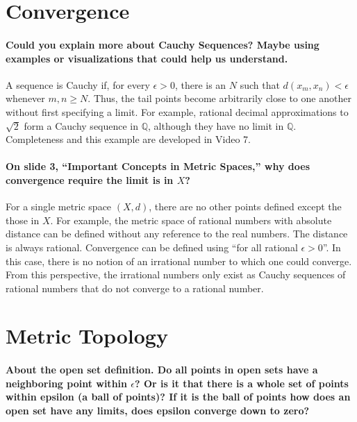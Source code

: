 \documentclass[10pt,english]{article}
\begin{document}
\section{Convergence}

\paragraph{Could you explain more about Cauchy Sequences? Maybe using examples or visualizations that could help us understand.}


A sequence is Cauchy if, for every $\epsilon>0$, there is an $N$ such that $d(x_m,x_n)<\epsilon$ whenever $m,n\geq N$.
Thus, the tail points become arbitrarily close to one another without first specifying a limit.
For example, rational decimal approximations to $\sqrt{2}$ form a Cauchy sequence in $\mathbb{Q}$, although they have no limit in $\mathbb{Q}$.
Completeness and this example are developed in Video 7.


\paragraph{On slide 3, ``Important Concepts in Metric Spaces,'' why does convergence require the limit is in $X$?}

For a single metric space $(X,d)$, there are no other points defined except the those in $X$.
For example, the metric space of rational numbers with absolute distance can be defined without any reference to the real numbers.
The distance is always rational.
Convergence can be defined using ``for all rational $\epsilon>0$''.
In this case, there is no notion of an irrational number to which one could converge.
From this perspective, the irrational numbers only exist as Cauchy sequences of rational numbers that do not converge to a rational number.

\section{Metric Topology}

\paragraph{About the open set definition. Do all points in open sets have a neighboring point within $\epsilon$? Or is it that there is a whole set of points within epsilon (a ball of points)? If it is the ball of points how does an open set have any limits, does epsilon converge down to zero?}
\end{document}
